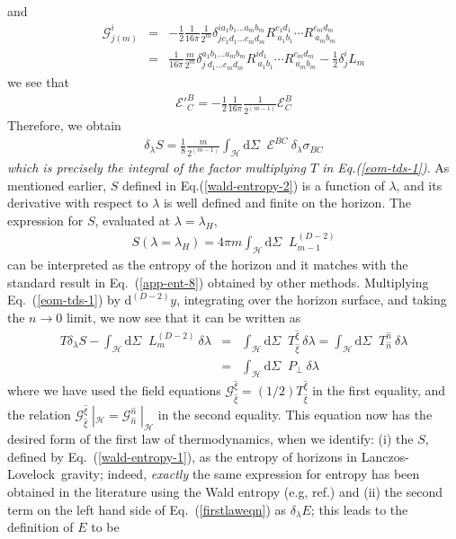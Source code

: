 \documentclass[12pt]{iopart}
\def\l{\left}
\def\r{\right}
\def\DM{\mathrm{d}}
\def\hatxi{\widehat{\xi}}
\def\hatn{\widehat{n}}
\def\eq#1{{Eq.~(\ref{#1})}}
\newcommand{\LL}{Lanczos-Lovelock}
\begin{document}
and 
\begin{eqnarray}
\mathcal{G}^i_{j(m)} &=&  - \frac{1}{2} \frac{1}{16 \pi} \frac{1}{2^m} \delta^{i a_1 b_1 \ldots a_m b_m}_{j c_1 d_1 \ldots c_m d_m} R^{c_1 d_1}_{~ a_1 b_1} \cdots R^{c_m d_m}_{~ a_m b_m}
\nonumber \\
&=& \frac{1}{16 \pi} \frac{m}{2^m} \delta^{a_1 b_1 \ldots a_m b_m}_{j_{~} d_1 \ldots c_m d_m} R^{i d_1}_{~ a_1 b_1} \cdots R^{c_m d_m}_{~ a_m b_m} - \frac{1}{2} \delta^i_{j} L_m
\label{eom-lovelock}
\end{eqnarray}
we see that
\begin{eqnarray}
\mathcal{E'}^B_C = - \frac{1}{2} \frac{1}{16 \pi} \frac{1}{2^{(m-1)}} \mathcal{E}^B_C
\end{eqnarray}
Therefore, we obtain
\begin{eqnarray}
\delta_{\lambda} S = \frac{1}{8} \frac{m}{2^{(m-1)}} \int_\mathcal{H} \DM \Sigma \;\; \mathcal{E}^{B C} ~ \delta_{\lambda} \sigma_{B C}
\end{eqnarray}
\textit{which is precisely the integral of the factor multiplying $T$ in Eq.\;(\ref{eom-tds-1})}. As mentioned earlier, $S$ defined in Eq.\;(\ref{wald-entropy-2}) is a function of $\lambda$, and its derivative with respect to $\lambda$ is well defined and finite on the horizon. The expression for $S$, evaluated at $\lambda=\lambda_H$, 
\begin{eqnarray}
S\l( \lambda=\lambda_H \r) = 4 \pi m \int_\mathcal{H} \DM \Sigma \;\; L^{(D-2)}_{m-1} \label{wald-entropy-1} 
\end{eqnarray}
can be interpreted as the entropy of the horizon and it  matches with
the standard result in  \eq{app-ent-8} obtained by other methods. 
Multiplying Eq.~(\ref{eom-tds-1}) by ${\DM}^{(D-2)} y$, integrating over the horizon surface, and taking the $n \rightarrow 0$ limit, we now see that it can be written as
\begin{eqnarray}
T {\delta}_{\lambda} S - \int_\mathcal{H} \DM \Sigma \;\; L^{(D-2)}_{m} ~ {\delta} \lambda  &=& \int_\mathcal{H} \DM \Sigma \;\; T^{\hatxi}_{\hatxi} ~ {\delta} \lambda
= \int_\mathcal{H} \DM \Sigma \;\; T^{\hatn}_{\hatn} ~ {\delta} \lambda\nonumber \\
&=& \int_\mathcal{H} \DM \Sigma \;\; P_{\perp} ~ {\delta} \lambda
\label{firstlaweqn}
\end{eqnarray}
where we have used the field equations $\mathcal{G}^{\hatxi}_{\hatxi} = (1/2) T^{\hatxi}_{\hatxi}$ in the first equality, and the relation $\mathcal{G}^{\hatxi}_{\hatxi} \;|_\mathcal{H} = \mathcal{G}^{\hatn}_{\hatn} \;|_\mathcal{H}$ in the second equality. This equation now has the desired form of the first law of thermodynamics, when we identify: (i)  the $S$, defined by Eq.~(\ref{wald-entropy-1}), as the entropy of horizons in \LL\ gravity; indeed, \textit{exactly} the same expression for entropy has been obtained in the literature using the Wald entropy (e.g, ref.\cite{entropyLL}) and (ii)  the second term on the left hand side of \eq{firstlaweqn} as $\delta_{\lambda} E$; this leads to the definition of $E$ to be
\end{document}
